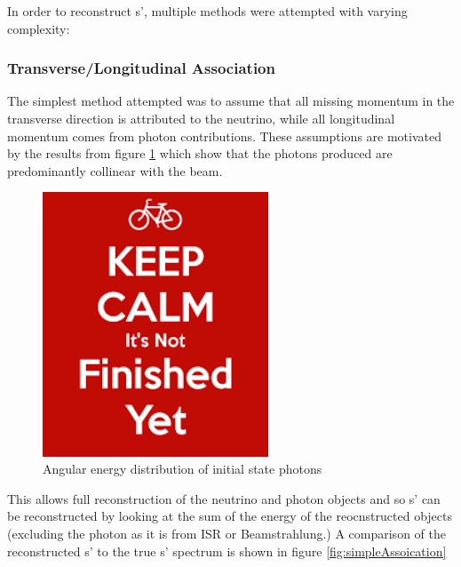 In order to reconstruct s', multiple methods were attempted with varying complexity:

\subsubsection{Transverse/Longitudinal Association}
The simplest method attempted was to assume that all missing momentum in the transverse direction is attributed to the neutrino, while all longitudinal momentum comes from photon contributions. These assumptions are motivated by the results from figure \ref{fig:photonspectrum} which show that the photons produced are predominantly collinear with the beam.

\begin{figure}
  \centering
  \includegraphics[width=0.6\textwidth]{figures/dummy}
  \caption[Angular energy distribution of initial state photons]{Angular energy distribution of initial state photons}
  \label{fig:photonspectrum}
\end{figure}

This allows full reconstruction of the neutrino and photon objects and so s' can be reconstructed by looking at the sum of the energy of the reocnstructed objects (excluding the photon as it is from ISR or Beamstrahlung.) A comparison of the reconstructed s' to the true s' spectrum is shown in figure \ref{fig:simpleAssoication}

